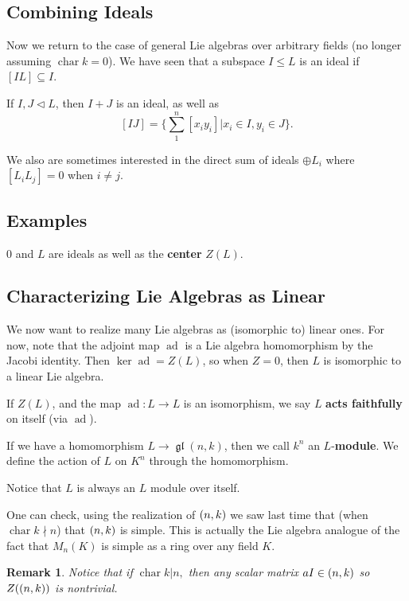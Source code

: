 \documentclass[12pt]{article}
\theoremstyle{nonumberbreak}
\theoremstyle{changebreak}
\theoremstyle{nonumberbreak}
\theoremstyle{change}
\newtheorem{rmk}[thm]{Remark}
\DeclareMathOperator{\ch}{char}
\DeclareMathOperator{\gl}{\mathfrak{gl}}
\let\sl\relax
\DeclareMathOperator{\sl}{\mathfrak{sl}}
\DeclareMathOperator{\ad}{ad}
\begin{document}
\subsection{Combining Ideals}
Now we return to the case of general Lie algebras over arbitrary fields (no longer assuming $\ch k=0$). 
We have seen that a subspace $I\le L$ is an ideal if $[IL]\subseteq I$.

If $I,J\lhd L$, then $I+J$ is an ideal, as well as
\[[IJ]=\{\sum_1^n [x_iy_i]|x_i\in I, y_i\in J\}.\]

We also are sometimes interested in the direct sum of ideals $\oplus L_i$ where $[L_iL_j]=0$ when $i\ne j$.

\subsection{Examples}
$0$ and $L$ are ideals as well as the \textbf{center} $Z(L)$.

\subsection{Characterizing Lie Algebras as Linear}
We now want to realize many Lie algebras as (isomorphic to) linear ones. For now, note that the adjoint map $\ad$
is a Lie algebra homomorphism by the Jacobi identity. Then $\ker\ad=Z(L)$, so when $Z=0$, then $L$ is isomorphic to 
a linear Lie algebra. 

\begin{defn}
	If $Z(L)$, and the map $\ad:L\to L$ is an isomorphism, we say $L$ \textbf{acts faithfully}
	on itself (via $\ad$).
\end{defn}

\begin{defn}
	If we have a homomorphism $L\to\gl(n,k)$, then we call $k^n$ an $L$-\textbf{module}.
	We define the action of $L$ on $K^n$ through the homomorphism.
\end{defn}

Notice that $L$ is always an $L$ module over itself.

One can check, using the realization of $\sl(n,k)$ we saw last time that (when $\ch k\nmid n$)
that $\sl(n,k)$ is simple. This is actually the Lie algebra analogue of the fact that $M_n(K)$ is simple
as a ring over any field $K$.

\begin{rmk}
	Notice that if $\ch k |n$$,$ then \textit{any} scalar matrix $aI\in\sl(n,k)$
	so $Z(\sl(n,k))$ is nontrivial.
\end{rmk}
\end{document}

